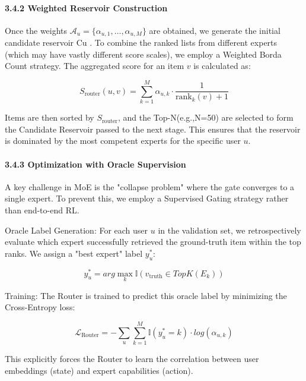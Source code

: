 \documentclass[]{article}
\let\oldparagraph\paragraph
\renewcommand{\paragraph}[1]{\oldparagraph{#1}\mbox{}}
\begin{document}
\hypertarget{weighted-reservoir-construction}{%
\paragraph{3.4.2 Weighted Reservoir
Construction}\label{weighted-reservoir-construction}}

Once the weights
\(\mathcal{A}_{u} = \{\alpha_{u,1},\ldots,\alpha_{u,M}\}\) are obtained,
we generate the initial candidate reservoir \(\text{Cu}\) . To combine
the ranked lists from different experts (which may have vastly different
score scales), we employ a Weighted Borda Count strategy. The aggregated
score for an item \(v\) is calculated as:

\[S_{\text{router}}\left( u,v \right) = \sum_{k = 1}^{M}\alpha_{u,k} \cdot \frac{1}{\text{rank}_{k}\left( v \right) + 1}\]

Items are then sorted by \(S_{\text{router}}\), and the Top-N(e.g.,N=50)
are selected to form the Candidate Reservoir passed to the next stage.
This ensures that the reservoir is dominated by the most competent
experts for the specific user \(u\).

\hypertarget{optimization-with-oracle-supervision}{%
\paragraph{3.4.3 Optimization with Oracle
Supervision}\label{optimization-with-oracle-supervision}}

A key challenge in MoE is the "collapse problem" where the gate
converges to a single expert. To prevent this, we employ a Supervised
Gating strategy rather than end-to-end RL.

Oracle Label Generation: For each user \(u\) in the validation set, we
retrospectively evaluate which expert successfully retrieved the
ground-truth item within the top ranks. We assign a "best expert" label
\(y_{u}^{\ast}\):

\[y_{u}^{\ast} = arg\max_{k}\mathbb{I}\left( v_{\text{truth}} \in TopK\left( E_{k} \right) \right)\]

Training: The Router is trained to predict this oracle label by
minimizing the Cross-Entropy loss:

\[\mathcal{L}_{\text{Router}} = - \sum_{u}^{}{\sum_{k = 1}^{M}\mathbb{I}}\left( y_{u}^{\ast} = k \right) \cdot log\left( \alpha_{u,k} \right)\]

This explicitly forces the Router to learn the correlation between user
embeddings (state) and expert capabilities (action).
\end{document}
